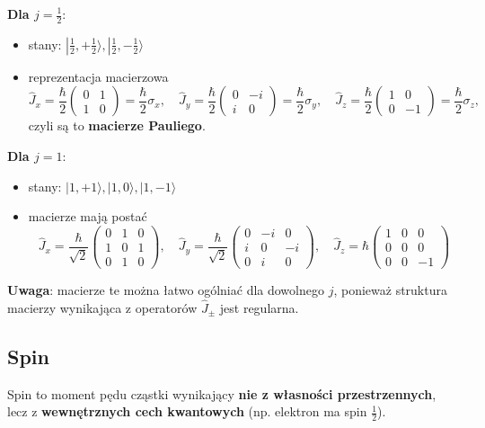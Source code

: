 \textbf{Dla $j = \frac{1}{2}$}:
\begin{itemize}
\item stany: $| \tfrac{1}{2}, +\tfrac{1}{2} \rangle, | \tfrac{1}{2}, -\tfrac{1}{2} \rangle$
\item reprezentacja macierzowa
$$
\hat{J}_x = \frac{\hbar}{2}
\begin{pmatrix}
0 & 1 \\
1 & 0
\end{pmatrix}
= \frac{\hbar}{2} \sigma_x,
\quad
\hat{J}_y = \frac{\hbar}{2}
\begin{pmatrix}
0 & -i \\
i & 0
\end{pmatrix}
= \frac{\hbar}{2} \sigma_y,
\quad
\hat{J}_z = \frac{\hbar}{2}
\begin{pmatrix}
1 & 0 \\
0 & -1
\end{pmatrix}
= \frac{\hbar}{2} \sigma_z,
$$
czyli są to \textbf{macierze Pauliego}.
\end{itemize}

\textbf{Dla $j = 1$}:
\begin{itemize}
\item stany: $|1, +1\rangle, |1, 0\rangle, |1, -1\rangle$
\item macierze mają postać
$$
\hat{J}_x = \frac{\hbar}{\sqrt{2}} 
\begin{pmatrix}
0 & 1 & 0 \\
1 & 0 & 1 \\
0 & 1 & 0
\end{pmatrix},
\quad
\hat{J}_y = \frac{\hbar}{\sqrt{2}} 
\begin{pmatrix}
0 & -i & 0 \\
i & 0 & -i \\
0 & i & 0
\end{pmatrix},
\quad
\hat{J}_z = \hbar 
\begin{pmatrix}
1 & 0 & 0 \\
0 & 0 & 0 \\
0 & 0 & -1
\end{pmatrix}
$$
\end{itemize}

\textbf{Uwaga}: macierze te można łatwo ogólniać dla dowolnego $j$, ponieważ struktura macierzy wynikająca z operatorów $\hat{J}_\pm$ jest regularna.

\subsection{Spin}
Spin to moment pędu cząstki wynikający \textbf{nie z własności przestrzennych}, lecz z \textbf{wewnętrznych cech kwantowych} (np. elektron ma spin $\frac{1}{2}$).

